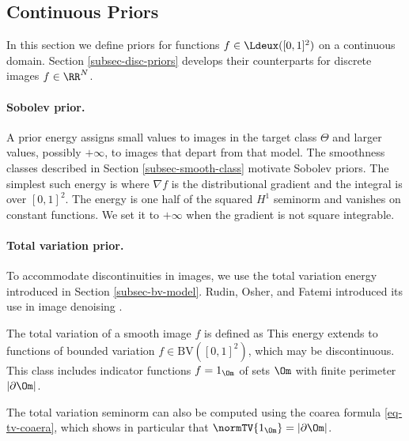           
\subsection{Continuous Priors}
\label{sec-sob-tv-cont}

In this section we define priors for functions $f \in \Ldeux([0,1]^2)$ on a continuous domain. Section \ref{subsec-disc-priors} develops their counterparts for discrete images $f \in \RR^N$.

  
\paragraph{Sobolev prior.}

A prior energy assigns small values to images in the target class $\Theta$ and larger values, possibly $+\infty$, to images that depart from that model. The smoothness classes described in Section \ref{subsec-smooth-class} motivate Sobolev priors. The simplest such energy is
where $\nabla f$ is the distributional gradient and the integral is over $[0,1]^2$. The energy is one half of the squared $H^1$ seminorm and vanishes on constant functions. We set it to $+\infty$ when the gradient is not square integrable.

  
\paragraph{Total variation prior.}

To accommodate discontinuities in images, we use the total variation energy introduced in Section \ref{subsec-bv-model}. Rudin, Osher, and Fatemi introduced its use in image denoising \cite{rudin-tv}.

The total variation of a smooth image $f$ is defined as 
This energy extends to functions of bounded variation $f \in \text{BV}([0,1]^2)$, which may be discontinuous. This class includes indicator functions $f=1_{\Om}$ of sets $\Om$ with finite perimeter $|\partial \Om|$.

The total variation seminorm can also be computed using the coarea formula \eqref{eq-tv-coaera}, which shows in particular that $\normTV{1_{\Om}} = |\partial \Om|$.


